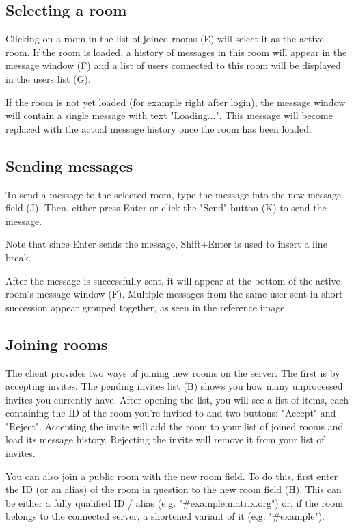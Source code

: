 \documentclass[titlepage]{scrartcl}
\begin{document}
\subsection{Selecting a room}
Clicking on a room in the list of joined rooms (E) will select it as the active room. If the room is loaded, a history of messages in this room will appear in the message window (F) and a list of users connected to this room will be displayed in the users list (G). 

If the room is not yet loaded (for example right after login), the message window will contain a single message with text "Loading...". This message will become replaced with the actual message history once the room has been loaded.

\subsection{Sending messages}
To send a message to the selected room, type the message into the new message field (J). Then, either press Enter or click the "Send" button (K) to send the message. 

Note that since Enter sends the message, Shift+Enter is used to insert a line break.

After the message is successfully sent, it will appear at the bottom of the active room's message window (F). Multiple messages from the same user sent in short succession appear grouped together, as seen in the reference image.

\subsection{Joining rooms}
The client provides two ways of joining new rooms on the server. The first is by accepting invites. The pending invites list (B) shows you how many unprocessed invites you currently have. After opening the list, you will see a list of items, each containing the ID of the room you're invited to and two buttons: "Accept" and "Reject". Accepting the invite will add the room to your list of joined rooms and load its message history. Rejecting the invite will remove it from your list of invites.

You can also join a public room with the new room field. To do this, first enter the ID (or an alias) of the room in question to the new room field (H). This can be either a fully qualified ID / alias (e.g. "\#example:matrix.org") or, if the room belongs to the connected server, a shortened variant of it (e.g. "\#example").
\end{document}
